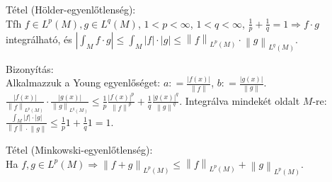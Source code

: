 \documentclass[12pt,a4paper]{scrartcl}
\newenvironment{tetel}{}{}
\newenvironment{bizonyitas}{}{}
\begin{document}
\begin{tetel}

Tétel (Hölder-egyenlőtlenség):\\
Tfh \(f \in L^{p}\left( M \right),g \in L^{q}\left( M \right)\),
\(1 < p < \infty\), \(1 < q < \infty\),
\(\left. \frac{1}{p} + \frac{1}{q} = 1\Rightarrow f \cdot g \right.\)
integrálható, és
\(\left| {\int_{M}{f \cdot g}} \right| \leq {\int_{M}{\left| f \right| \cdot \left| g \right|}} \leq \left\| f \right\|_{L^{p}{(M)}} \cdot \left\| g \right\|_{L^{q}{(M)}}\).

\end{tetel}

\begin{bizonyitas}

Bizonyítás:\\
Alkalmazzuk a Young egyenlőséget:
\(a: = \frac{\left| {f\left( x \right)} \right|}{\left\| f \right\|}\),
\(b: = \frac{\left| {g\left( x \right)} \right|}{\left\| g \right\|}\).
\(\frac{\left| {f\left( x \right)} \right|}{\left\| f \right\|_{L^{p}{(M)}}} \cdot \frac{\left| {g\left( x \right)} \right|}{\left\| g \right\|_{L^{q}{(M)}}} \leq \frac{1}{p}\frac{\left| {f\left( x \right)} \right|^{p}}{\left\| f \right\|^{p}} + \frac{1}{q}\frac{\left| {g\left( x \right)} \right|^{q}}{\left\| g \right\|^{q}}\).
Integrálva mindekét oldalt \(M\)-re:
\(\frac{\int_{M}{\left| f \right| \cdot \left| g \right|}}{\left\| f \right\| \cdot \left\| g \right\|} \leq \frac{1}{p}1 + \frac{1}{q}1 = 1\).

\end{bizonyitas}

\begin{tetel}

Tétel (Minkowski-egyenlőtlenség):\\
Ha
\(\left. f,g \in L^{p}\left( M \right)\Rightarrow\left\| {f + g} \right\|_{L^{p}{(M)}} \leq \left\| f \right\|_{L^{p}{(M)}} + \left\| g \right\|_{L^{p}{(M)}} \right.\).

\end{tetel}
\end{document}
